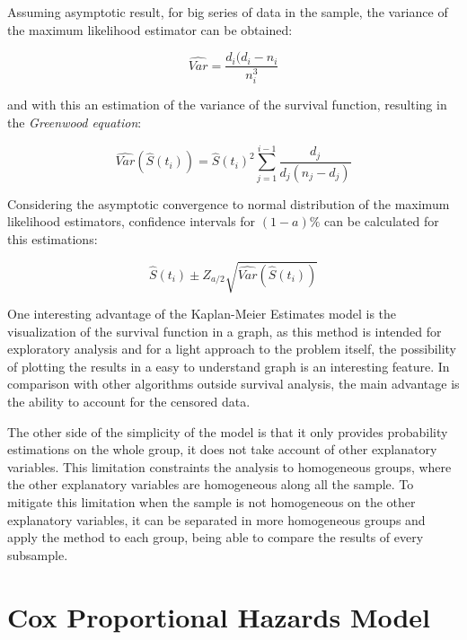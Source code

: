 \documentclass[11pt]{book} %
\begin{document}
    Assuming asymptotic result, for big series of data in the sample, the variance of the maximum likelihood estimator can be obtained:

    \begin{equation}
      \widehat{Var} = \frac{d_i(d_i-n_i}{n_i^3}
      \label{eq:km-havar-variance}
    \end{equation}

    and with this an estimation of the variance of the survival function, resulting in the \emph{Greenwood equation}:

    \begin{equation}
      \widehat{Var}(\widehat{S}(t_i)) = \widehat{S}(t_i)^2 \sum_{j=1}^{i-1} \frac{d_j}{d_j(n_j-d_j)}
      \label{eq:km-greenwood-eq}
    \end{equation}

    Considering the asymptotic convergence to normal distribution of the maximum likelihood estimators, confidence intervals for $(1 - a)\%$ can be calculated for this estimations:

    \begin{equation}
      \widehat{S}(t_i)\pm Z_{a/2}\sqrt{\widehat{Var}(\widehat{S}(t_i))}
      \label{eq:km-confidence-intervals}
    \end{equation}

    One interesting advantage of the Kaplan-Meier Estimates model is the visualization of the survival function in a graph, as this method is intended for exploratory analysis and for a light approach to the problem itself, the possibility of plotting the results in a easy to understand graph is an interesting feature. In comparison with other algorithms outside survival analysis, the main advantage is the ability to account for the censored data.

    The other side of the simplicity of the model is that it only provides probability estimations on the whole group, it does not take account of other explanatory variables. This limitation constraints the analysis to homogeneous groups, where the other explanatory variables are homogeneous along all the sample. To mitigate this limitation when the sample is not homogeneous on the other explanatory variables, it can be separated in more homogeneous groups and apply the method to each group, being able to compare the results of every subsample.

  \section{Cox Proportional Hazards Model}
\end{document}
